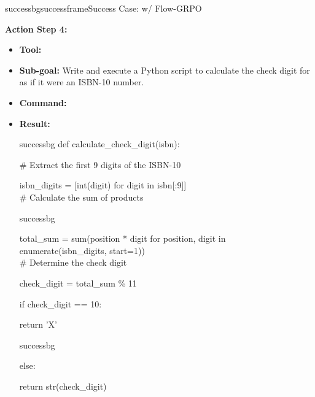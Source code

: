 \begin{small}
\begin{center}
\begin{casebox}{successbg}{successframe}{Success Case: \model w/ Flow-GRPO}
    \vspace{1em}

    \textbf{Action Step 4:}
    \begin{itemize}[nosep, leftmargin=*]
        \item \textbf{Tool:} 
        \item \textbf{Sub-goal:} Write and execute a Python script to calculate the check digit for  as if it were an ISBN-10 number.
        \item \textbf{Command:}

        \item \textbf{Result:}
        \begin{casecode}{successbg}
def calculate\_check\_digit(isbn):

\hspace{4mm}\# Extract the first 9 digits of the ISBN-10

\hspace{4mm}isbn\_digits = [int(digit) for digit in isbn[:9]]
\\

\hspace{4mm}\# Calculate the sum of products

        \end{casecode}
        \begin{casecode}{successbg}
        
\hspace{4mm}total\_sum = sum(position * digit for position, digit in enumerate(isbn\_digits, start=1))
\\

\hspace{4mm}\# Determine the check digit

\hspace{4mm}check\_digit = total\_sum \% 11

\hspace{4mm}if check\_digit == 10:

\hspace{8mm}return 'X'

        \end{casecode}
        \begin{casecode}{successbg}
        
\hspace{4mm}else:

\hspace{8mm}return str(check\_digit)
\\


\end{casecode}
\end{itemize}
\end{casebox}
\end{center}
\end{small}
